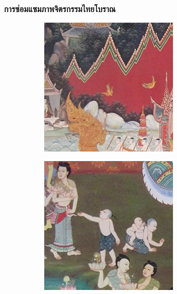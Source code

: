 \documentclass[xcolor=dvipsnames, xetex,serif]{beamer}
\numberwithin{equation}{section}
\begin{document}
	\begin{frame}
        \frametitle{การซ่อมแซมภาพจิตรกรรมไทยโบราณ}
        \begin{figure}[H]
            \centering
            \begin{subfigure}{0.15\linewidth}
                \centering
                \includegraphics[width=0.9\linewidth]{images/thaiart/case01-original.png}
            \end{subfigure}
            \begin{subfigure}{0.15\linewidth}
                \centering
                \includegraphics[width=0.9\linewidth]{images/thaiart/case02-original.png}

\end{subfigure}
\end{figure}
\end{frame}
\end{document}
